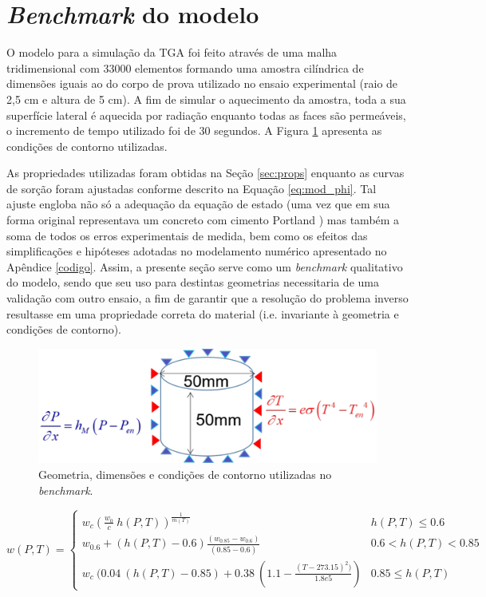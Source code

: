 \section{\textit{Benchmark} do modelo}
O modelo para a simulação da TGA foi feito através de uma malha tridimensional
com 33000 elementos formando uma amostra cilíndrica de dimensões iguais ao do
corpo de prova utilizado no ensaio experimental (raio de 2,5 cm e altura de 5
cm). A fim de simular o aquecimento da amostra, toda a sua superfície lateral é
aquecida por radiação enquanto todas as faces são permeáveis, o incremento de
tempo utilizado foi de 30 segundos. A Figura \ref{fig:bench_setup} apresenta as
condições de contorno utilizadas.

As propriedades utilizadas foram obtidas na Seção \ref{sec:props} enquanto as
curvas de sorção foram ajustadas conforme descrito na Equação \ref{eq:mod_phi}. Tal ajuste
engloba não só a adequação da equação de estado (uma vez que em sua forma
original representava um concreto com cimento Portland \cite{bazant1979}) mas
também a soma de todos os erros experimentais de medida, bem como os efeitos das
simplificações e hipóteses adotadas no modelamento numérico apresentado no
Apêndice \ref{codigo}. Assim, a presente seção serve como um {\it benchmark}
qualitativo do modelo, sendo que seu uso para destintas geometrias necessitaria
de uma validação com outro ensaio, a fim de garantir que a resolução do problema
inverso resultasse em uma propriedade correta do material (i.e. invariante à
geometria e condições de contorno).

\begin{figure}[ht]
	\centering
	\includegraphics[width=12cm]{./figures/bench_setup.pdf}
	\caption{Geometria, dimensões e condições de contorno utilizadas no {\it benchmark}.
  \label{fig:bench_setup}}
\end{figure}

    \begin{equation}
      \label{eq:mod_phi}
      w(P, T) =
      \begin{cases} 
      w_c \left( \frac{w_0}{c} \ h(P,T) \right)^{\frac{1}{m(T)}} & h(P, T)\leq 0.6 \\
      w_{0.6} + (h(P, T) - 0.6) \frac{(w_{0.85} - w_{0.6})}{(0.85-0.6)} & 0.6 < h(P, T) < 0.85 \\
      w_c \ (0.04 \ (h(P, T) - 0.85) + 0.38 \ (1.1 - \frac{(T - 273.15)^2)}{1.8e5}) & 0.85 \leq h(P, T) 
      \end{cases}
    \end{equation}
 

